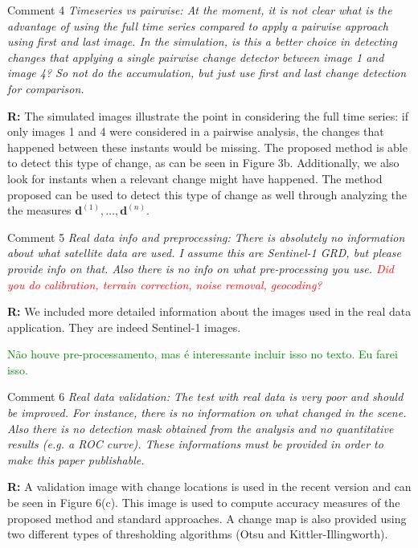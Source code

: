 \documentclass[11pt]{report}
\begin{document}
\medskip
\begin{mybox}{Comment 4}
\textit{Timeseries vs pairwise: At the moment, it is not clear what is the advantage of using the full time series
compared to apply a pairwise approach using first and last image. In the simulation, is this a better choice in
detecting changes that applying a single pairwise change detector between image 1 and image 4? So not do the
accumulation, but just use first and last change detection for comparison.}


\medskip
\textbf{R:} The simulated images illustrate the point in considering the full time series: if only images 1 and 4 were considered in a pairwise analysis, the changes that happened between these instants would be missing. The proposed method is able to detect this type of change, as can be seen in Figure 3b. Additionally, we also look for instants when a relevant change might have happened. The method proposed can be used to detect this type of change as well through analyzing the the measures $\mathbf{d}^{(1)},\ldots,\mathbf{d}^{(n)}$.
\end{mybox}

\medskip
\begin{mybox}{Comment 5}
\textit{Real data info and preprocessing: There is absolutely no information about what satellite data are used. I
assume this are Sentinel-1 GRD, but please provide info on that. Also there is no info on what pre-processing
you use. \textcolor{red}{Did you do calibration, terrain correction, noise removal, geocoding?}}


\medskip
\textbf{R:} We included more detailed information about the images used in the real data application. They are indeed Sentinel-1 images.

\textcolor{green}{Não houve pre-processamento, mas é interessante incluir isso no texto. Eu farei isso.}
\end{mybox}

\medskip
\begin{mybox}{Comment 6}
\textit{Real data validation: The test with real data is very poor and should be improved. For instance, there is
no information on what changed in the scene. Also there is no detection mask obtained from the analysis and
no quantitative results (e.g. a ROC curve). These informations must be provided in order to make this paper
publishable.}


\medskip
\textbf{R:} A validation image with change locations is used in the recent version and can be seen in Figure 6(c). This image is used to compute accuracy measures of the proposed method and standard approaches. A change map is also provided using two different types of thresholding algorithms (Otsu and Kittler-Illingworth).
\end{mybox}
\end{document}
